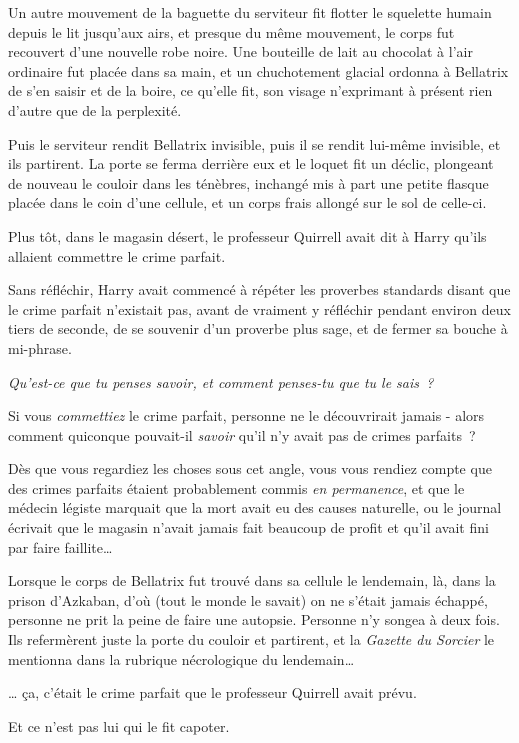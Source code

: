 Un autre mouvement de la baguette du serviteur fit flotter le squelette humain depuis le lit jusqu'aux airs, et presque du même mouvement, le corps fut recouvert d'une nouvelle robe noire. Une bouteille de lait au chocolat à l'air ordinaire fut placée dans sa main, et un chuchotement glacial ordonna à Bellatrix de s'en saisir et de la boire, ce qu'elle fit, son visage n'exprimant à présent rien d'autre que de la perplexité.

Puis le serviteur rendit Bellatrix invisible, puis il se rendit lui-même invisible, et ils partirent. La porte se ferma derrière eux et le loquet fit un déclic, plongeant de nouveau le couloir dans les ténèbres, inchangé mis à part une petite flasque placée dans le coin d'une cellule, et un corps frais allongé sur le sol de celle-ci.

\later

Plus tôt, dans le magasin désert, le professeur Quirrell avait dit à Harry qu'ils allaient commettre le crime parfait.

Sans réfléchir, Harry avait commencé à répéter les proverbes standards disant que le crime parfait n'existait pas, avant de vraiment y réfléchir pendant environ deux tiers de seconde, de se souvenir d'un proverbe plus sage, et de fermer sa bouche à mi-phrase.

\emph{Qu'est-ce que tu penses savoir, et comment penses-tu que tu le sais~?}

Si vous \emph{commettiez} le crime parfait, personne ne le découvrirait jamais - alors comment quiconque pouvait-il \emph{savoir} qu'il n'y avait pas de crimes parfaits~?

Dès que vous regardiez les choses sous cet angle, vous vous rendiez compte que des crimes parfaits étaient probablement commis \emph{en permanence}, et que le médecin légiste marquait que la mort avait eu des causes naturelle, ou le journal écrivait que le magasin n'avait jamais fait beaucoup de profit et qu'il avait fini par faire faillite…

Lorsque le corps de Bellatrix fut trouvé dans sa cellule le lendemain, là, dans la prison d'Azkaban, d'où (tout le monde le savait) on ne s'était jamais échappé, personne ne prit la peine de faire une autopsie. Personne n'y songea à deux fois. Ils refermèrent juste la porte du couloir et partirent, et la \emph{Gazette du Sorcier} le mentionna dans la rubrique nécrologique du lendemain…

… ça, c'était le crime parfait que le professeur Quirrell avait prévu.

Et ce n'est pas lui qui le fit capoter.

